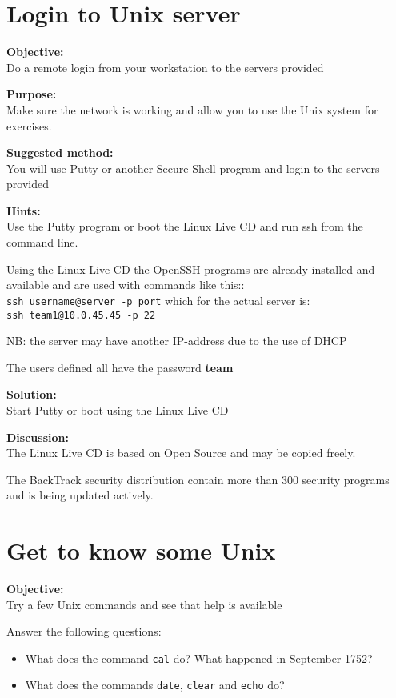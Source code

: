 \documentclass[a4paper,11pt,notitlepage]{report}
\begin{document}
\chapter{Login to Unix server}
\label{ex:unix-login}


{\bf Objective:}\\
Do a remote login from your workstation to the servers provided

{\bf Purpose:}\\
Make sure the network is working and allow you to use the Unix system for exercises.

{\bf Suggested method:}\\
You will use Putty or another Secure Shell program and login to the servers provided

{\bf Hints:}\\
Use the Putty program or boot the Linux Live CD and run ssh from the command line.

Using the Linux Live CD the OpenSSH programs are already installed and available
and are used with commands like this::\\
\verb+ssh username@server -p port+ which for the actual server is:\\
\verb+ssh team1@10.0.45.45 -p 22+

NB: the server may have another IP-address due to the use of DHCP

The users defined all have the password {\bf team}

{\bf Solution:}\\
Start Putty or boot using the Linux Live CD

{\bf Discussion:}\\
The Linux Live CD is based on Open Source and may be copied freely.

The BackTrack security distribution contain more than 300 security programs and is being updated actively.


\chapter{Get to know some Unix}
\label{ex:unix-cal}

{\bf Objective:}\\
Try a few Unix commands and see that help is available

Answer the following questions:
\begin{itemize}
\item What does the command \verb+cal+ do? What happened in September 1752?
\item What does the commands \verb+date+, \verb+clear+ and \verb+echo+ do?
\end{itemize}
\end{document}
